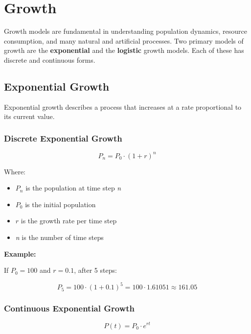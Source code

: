 \newpage
\section{Growth}

Growth models are fundamental in understanding population dynamics, resource consumption, and many natural and artificial processes. Two primary models of growth are the \textbf{exponential} and the \textbf{logistic} growth models. Each of these has discrete and continuous forms.

\subsection{Exponential Growth}

Exponential growth describes a process that increases at a rate proportional to its current value.

\subsubsection{Discrete Exponential Growth}

\[
  P_{n} = P_0 \cdot (1 + r)^n
\]

Where:

\begin{itemize}

  \item \(P_n\) is the population at time step \emph{n}

  \item \(P_0\) is the initial population

  \item \(r\) is the growth rate per time step

  \item \emph{n} is the number of time steps

\end{itemize}

\textbf{Example:}
\vspace{\baselineskip}
  
If \(P_0 = 100\) and \(r = 0.1\), after 5 steps:

\[
  P_5 = 100 \cdot {(1 + 0.1)}^5 = 100 \cdot 1.61051 \approx 161.05
\]

\subsubsection{Continuous Exponential Growth}

  \[
P(t) = P_0 \cdot e^{rt}
\]

